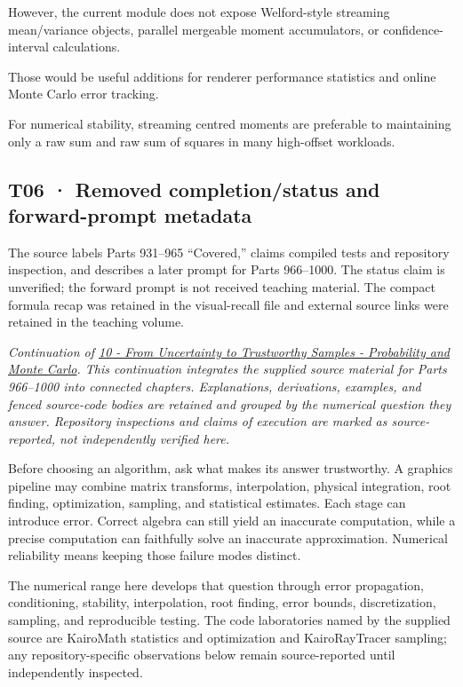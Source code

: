 However, the current module does not expose Welford-style streaming mean/variance objects, parallel mergeable moment accumulators, or confidence-interval calculations.

Those would be useful additions for renderer performance statistics and online Monte Carlo error tracking.

For numerical stability, streaming centred moments are preferable to maintaining only a raw sum and raw sum of squares in many high-offset workloads.

\subsection{T06 · Removed completion/status and forward-prompt metadata}\label{02-foundations-ii-ch039-t06-removed-completionstatus-and-forward-prompt-metadata}

The source labels Parts 931--965 ``Covered,'' claims compiled tests and repository inspection, and describes a later prompt for Parts 966--1000. The status claim is unverified; the forward prompt is not received teaching material. The compact formula recap was retained in the visual-recall file and external source links were retained in the teaching volume.

\emph{Continuation of \hyperref[02-foundations-ii-ch039-learning-route]{10 - From Uncertainty to Trustworthy Samples - Probability and Monte Carlo}. This continuation integrates the supplied source material for Parts 966--1000 into connected chapters. Explanations, derivations, examples, and fenced source-code bodies are retained and grouped by the numerical question they answer. Repository inspections and claims of execution are marked as source-reported, not independently verified here.}

Before choosing an algorithm, ask what makes its answer trustworthy. A graphics pipeline may combine matrix transforms, interpolation, physical integration, root finding, optimization, sampling, and statistical estimates. Each stage can introduce error. Correct algebra can still yield an inaccurate computation, while a precise computation can faithfully solve an inaccurate approximation. Numerical reliability means keeping those failure modes distinct.

The numerical range here develops that question through error propagation, conditioning, stability, interpolation, root finding, error bounds, discretization, sampling, and reproducible testing. The code laboratories named by the supplied source are KairoMath statistics and optimization and KairoRayTracer sampling; any repository-specific observations below remain source-reported until independently inspected.

